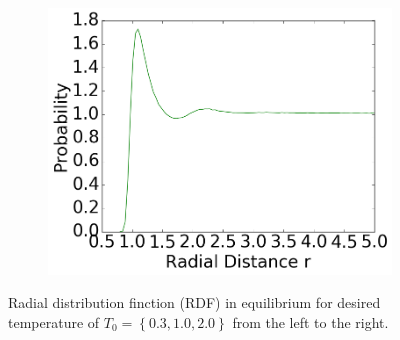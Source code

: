 \begin{figure}[ht]
\begin{subfigure}{0.3\textwidth}
\includegraphics[width=\textwidth]{../dat/meanRDF_T2d0_F20d0.png}
\end{subfigure}
\caption{Radial distribution finction (RDF) in equilibrium for desired temperature of $T_0=\left\lbrace 0.3,1.0,2.0\right\rbrace$ from the left to the right.} 
\label{9plotrdf}
\end{figure}

